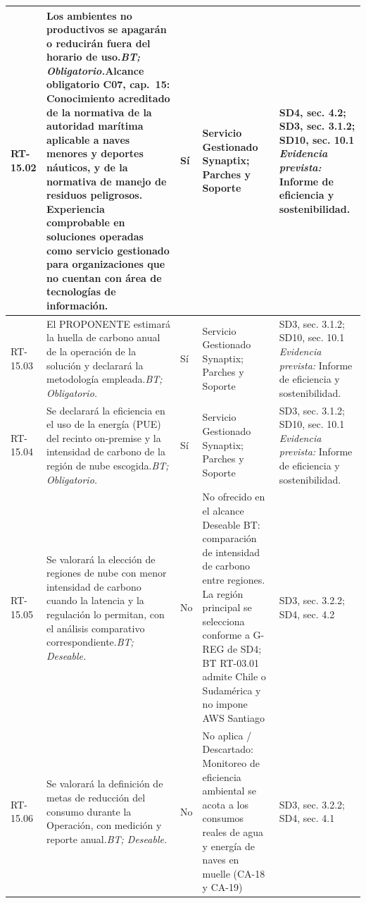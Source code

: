\begin{paginaHorizontalSynaptix}
\begin{longtable}{|L{0.09\AnchoMatrizTDoce}|L{0.385\AnchoMatrizTDoce}|L{0.065\AnchoMatrizTDoce}|L{0.18\AnchoMatrizTDoce}|L{0.28\AnchoMatrizTDoce}|}
RT-\allowbreak{}15.\allowbreak{}02 &
Los ambientes no productivos se apagarán o reducirán fuera del horario de uso.\newline\textit{BT; Obligatorio.}\newline\textbf{Alcance obligatorio C07, cap.~15:} Conocimiento acreditado de la normativa de la autoridad marítima aplicable a naves menores y deportes náuticos, y de la normativa de manejo de residuos peligrosos. Experiencia comprobable en soluciones operadas como servicio gestionado para organizaciones que no cuentan con área de tecnologías de información. &
Sí &
Servicio Gestionado Synaptix; Parches y Soporte &
SD4, sec. 4.2; SD3, sec. 3.1.2; SD10, sec. 10.1 \newline\textit{Evidencia prevista:} Informe de eficiencia y sostenibilidad. \\ \hline

RT-\allowbreak{}15.\allowbreak{}03 &
El PROPONENTE estimará la huella de carbono anual de la operación de la solución y declarará la metodología empleada.\newline\textit{BT; Obligatorio.} &
Sí &
Servicio Gestionado Synaptix; Parches y Soporte &
SD3, sec. 3.1.2; SD10, sec. 10.1 \newline\textit{Evidencia prevista:} Informe de eficiencia y sostenibilidad. \\ \hline

RT-\allowbreak{}15.\allowbreak{}04 &
Se declarará la eficiencia en el uso de la energía (PUE) del recinto on-premise y la intensidad de carbono de la región de nube escogida.\newline\textit{BT; Obligatorio.} &
Sí &
Servicio Gestionado Synaptix; Parches y Soporte &
SD3, sec. 3.1.2; SD10, sec. 10.1 \newline\textit{Evidencia prevista:} Informe de eficiencia y sostenibilidad. \\ \hline

RT-\allowbreak{}15.\allowbreak{}05 &
Se valorará la elección de regiones de nube con menor intensidad de carbono cuando la latencia y la regulación lo permitan, con el análisis comparativo correspondiente.\newline\textit{BT; Deseable.} &
No &
No ofrecido en el alcance Deseable BT: comparación de intensidad de carbono entre regiones. La región principal se selecciona conforme a G-REG de SD4; BT RT-03.01 admite Chile o Sudamérica y no impone AWS Santiago &
SD3, sec. 3.2.2; SD4, sec. 4.2 \\ \hline

RT-\allowbreak{}15.\allowbreak{}06 &
Se valorará la definición de metas de reducción del consumo durante la Operación, con medición y reporte anual.\newline\textit{BT; Deseable.} &
No &
No aplica / Descartado: Monitoreo de eficiencia ambiental se acota a los consumos reales de agua y energía de naves en muelle (CA-18 y CA-19) &
SD3, sec. 3.2.2; SD4, sec. 4.1 \\ \hline


\end{longtable}
\end{paginaHorizontalSynaptix}
